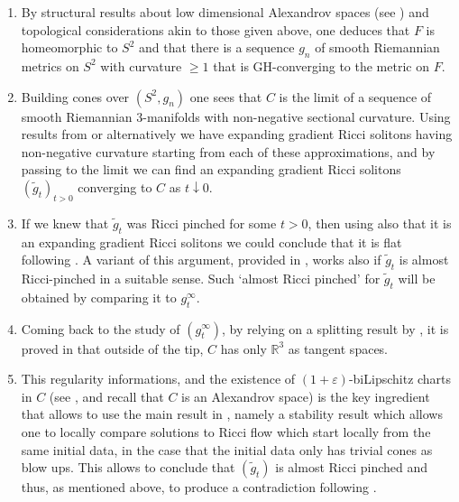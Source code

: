 \documentclass[11pt]{article}
\numberwithin{equation}{section}
\newcommand{\R}{\mathbb{R}}
\newcommand{\eps}{\varepsilon}
\begin{document}
\begin{enumerate}[label=(\roman*)]
\item By structural results about low dimensional Alexandrov spaces (see \cite{IRV15}) and topological considerations akin to those given above, one deduces that $F$ is homeomorphic to $S^2$ and that there is a sequence $g_n$ of smooth Riemannian metrics on $S^2$ with curvature $\geq 1$ that is GH-converging to the metric on $F$.
\item Building cones over $(S^2,g_n)$ one sees that $C$ is the limit of a sequence of smooth Riemannian 3-manifolds with non-negative sectional curvature. Using results from \cite{Der16} or alternatively \cite{SchSim13} we have  expanding gradient Ricci solitons  having non-negative curvature starting from each of these approximations, and by passing to the limit we can find an expanding gradient Ricci solitons $(\tilde g_t)_{t>0}$ converging to $C$ as $t\downarrow0$.
\item If we knew that  $\tilde g_t$ was Ricci pinched for some $t>0$, then using also that it is an expanding gradient Ricci solitons we could conclude that it is flat following   \cite{CheZhu00}. A variant of this argument, provided in  \cite{DSS22}, works also if $\tilde g_t$ is almost Ricci-pinched in a suitable sense. Such `almost Ricci pinched' for  $\tilde g_t$ will be obtained by comparing it to $g^\infty_t$.
\item Coming back to the study of $(g^\infty_t)$, by relying on a splitting result by \cite{HochardThesis}, it is proved in \cite[Lemma 81]{DSS22} that outside of the tip, $C$ has only $\R^3$ as tangent spaces.
\item This regularity informations, and the existence of $(1+\eps)$-biLipschitz charts in $C$ (see \cite{BGP92}, \cite{BBI01} and recall that $C$  is an Alexandrov space) is the key ingredient that allows to use the main result in \cite{DSS22}, namely  a stability result which allows one to locally compare solutions to Ricci flow which start locally from the same initial data, in the case that the initial data only has trivial cones as blow ups. This allows to conclude that $(\tilde g_t)$ is almost Ricci pinched and thus, as mentioned above, to produce a contradiction following \cite{CheZhu00}.
\end{enumerate}
\end{document}
